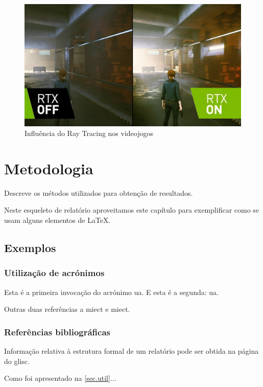 \documentclass{report}
\begin{document}
\begin{figure}[h]
\centering
\includegraphics[width=1.2\textwidth]{rt_comp.jpg}
\caption{Influência do Ray Tracing nos videojogos}
\label{fig:rt_comp}
\end{figure}
\clearpage


\chapter{Metodologia}
\label{chap.metodologia}
Descreve os métodos utilizados para obtenção de resultados.

Neste esqueleto de relatório aproveitamos este capítulo para exemplificar
como se usam alguns elementos de {\LaTeX}.

\section{Exemplos}

\subsection{Utilização de acrónimos}
\label{sec.util}
Esta é a primeira invocação do acrónimo \ac{ua}.
E esta é a segunda: \ac{ua}.


Outras duas referências a \ac{miect}
e \ac{miect}.

\subsection{Referências bibliográficas}
Informação relativa à estrutura formal de um relatório pode ser obtida
na página do \ac{glisc}.

Como foi apresentado na \autoref{sec.util}...
\end{document}
